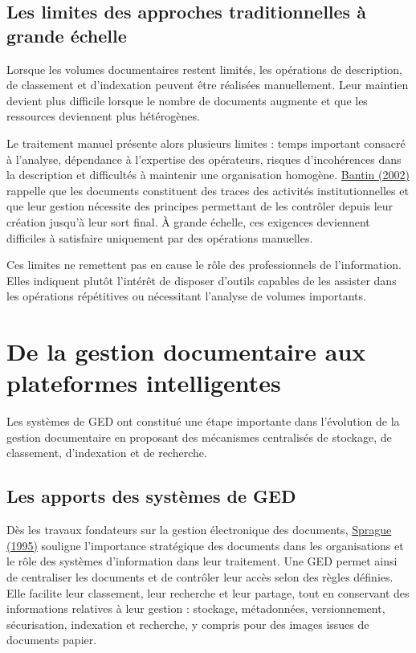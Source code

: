 \documentclass[12pt,a4paper]{report}
\newcommand{\citer}[2]{\hyperref[ref:#1]{#2}}
\begin{document}
\subsection{Les limites des approches traditionnelles à grande échelle}
Lorsque les volumes documentaires restent limités, les opérations de description, de classement et d'indexation peuvent être réalisées manuellement. Leur maintien devient plus difficile lorsque le nombre de documents augmente et que les ressources deviennent plus hétérogènes.

Le traitement manuel présente alors plusieurs limites : temps important consacré à l'analyse, dépendance à l'expertise des opérateurs, risques d'incohérences dans la description et difficultés à maintenir une organisation homogène. \citer{bantin2002}{Bantin (2002)} rappelle que les documents constituent des traces des activités institutionnelles et que leur gestion nécessite des principes permettant de les contrôler depuis leur création jusqu'à leur sort final. À grande échelle, ces exigences deviennent difficiles à satisfaire uniquement par des opérations manuelles.

Ces limites ne remettent pas en cause le rôle des professionnels de l'information. Elles indiquent plutôt l'intérêt de disposer d'outils capables de les assister dans les opérations répétitives ou nécessitant l'analyse de volumes importants.

\section{De la gestion documentaire aux plateformes intelligentes}
Les systèmes de GED ont constitué une étape importante dans l'évolution de la gestion documentaire en proposant des mécanismes centralisés de stockage, de classement, d'indexation et de recherche.

\subsection{Les apports des systèmes de GED}
Dès les travaux fondateurs sur la gestion électronique des documents, \citer{sprague1995}{Sprague (1995)} souligne l'importance stratégique des documents dans les organisations et le rôle des systèmes d'information dans leur traitement. Une GED permet ainsi de centraliser les documents et de contrôler leur accès selon des règles définies. Elle facilite leur classement, leur recherche et leur partage, tout en conservant des informations relatives à leur gestion : stockage, métadonnées, versionnement, sécurisation, indexation et recherche, y compris pour des images issues de documents papier.
\end{document}
